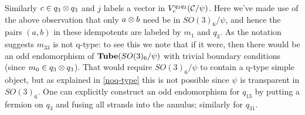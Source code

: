 Similarly $c \in q_3 \otimes q_3$ and $j$ labels a vector in $V^{q_3 q_3}_c(\mathcal{C}/\psi)$.
Here we've made use of the above observation that only $a \otimes b$ need be in $SO(3)_6/\psi$, 
and hence the pairs $(a,b)$ in these idempotents are labeled by $m_1$ and $q_3$.
As the notation suggests $m_{33}$ is not q-type:
 to see this we note that if it were, then there would 
be an odd endomorphism of $\textbf{Tube}(SO(3)_6/\psi)$ with trivial boundary conditions (since $m_0 \in q_3 \otimes q_3$).
That would require $SO(3)_6/\psi$ to contain a q-type simple object, 
but as explained in \eqref{noq-type} this is not possible since $\psi$ is transparent in $SO(3)_6$.
One can explicitly construct an odd endomorphism for $q_{13}$ by putting a fermion on $q_3$ and fusing all strands into the annulus;
similarly for $q_{31}$. 




